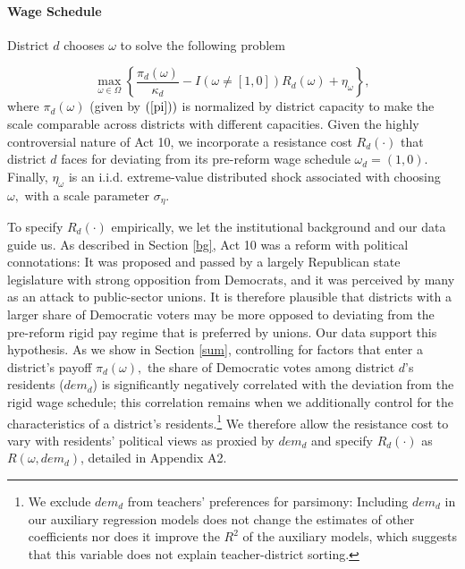 \documentclass[notitlepage,12pt]{article}%
\begin{document}
\paragraph{Wage Schedule}

District $d$ chooses $\omega$ to solve the following problem%

\begin{equation}
\max_{\omega\in\Omega}\left\{  \frac{\pi_{d}\left(  \omega\right)  }%
{\kappa_{d}}-I\left(  \omega\neq\left[  1,0\right]  \right)  R_{d}\left(
\omega\right)  +\eta_{\omega}\right\}  , \label{pp}%
\end{equation}
where $\pi_{d}\left(  \omega\right)  $ (given by $\left(  \ref{pi}\right)  )$
is normalized by district capacity to make the scale comparable across
districts with different capacities$.$ Given the highly controversial nature
of Act 10, we incorporate a resistance cost $R_{d}\left(  \cdot\right)  $ that
district $d$ faces for deviating from its pre-reform wage schedule $\omega
_{d}=\left(  1,0\right)  $. Finally, $\eta_{\omega}$ is an i.i.d.
extreme-value distributed shock associated with choosing $\omega,$ with a
scale parameter $\sigma_{\eta}.$

To specify $R_{d}\left(  \cdot\right)  $ empirically, we let the institutional
background and our data guide us. As described in Section \ref{bg}, Act 10 was
a reform with political connotations: It was proposed and passed by a largely
Republican state legislature with strong opposition from Democrats, and it was
perceived by many as an attack to public-sector unions. It is therefore
plausible that districts with a larger share of Democratic voters may be more
opposed to deviating from the pre-reform rigid pay regime that is preferred by
unions. Our data support this hypothesis. As we show in Section \ref{sum},
controlling for factors that enter a district's payoff $\pi_{d}\left(
\omega\right)  ,$ the share of Democratic votes among district $d$'s residents
($dem_{d}$) is significantly negatively correlated with the deviation from the
rigid wage schedule; this correlation remains when we additionally control for
the characteristics of a district's residents.\footnote{We exclude $dem_{d}$
from teachers' preferences for parsimony: Including $dem_{d}$ in our auxiliary
regression models does not change the estimates of other coefficients nor does
it improve the $R^{2}$ of the auxiliary models, which suggests that this
variable does not explain teacher-district sorting.} We therefore allow the
resistance cost to vary with residents' political views as proxied by
$dem_{d}$ and specify $R_{d}\left(  \cdot\right)  $ as $R\left(
\omega,dem_{d}\right)  $, detailed in Appendix A2.
\end{document}
